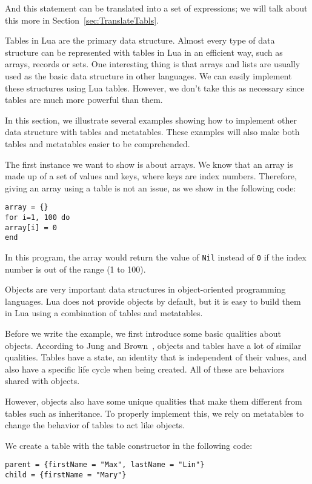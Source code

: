 And this statement can be translated into a set of expressions; we will talk about this more in Section~\ref{sec:TranslateTabls}.

Tables in Lua are the primary data structure. Almost every type of data structure can be represented with tables in Lua in an efficient way, such as arrays, records or sets. One interesting thing is that arrays and lists are usually used as the basic data structure in other languages. We can easily implement these structures using Lua tables. However, we don't take this as necessary since tables are much more powerful than them.

In this section, we illustrate several examples showing how to implement other data structure with tables and metatables. These examples will also make both tables and metatables easier to be comprehended.

The first instance we want to show is about arrays. We know that an array is made up of a set of values and keys, where keys are index numbers. Therefore, giving an array using a table is not an issue, as we show in the following code:

\begin{verbatim}
array = {}
for i=1, 100 do
array[i] = 0
end
\end{verbatim}

In this program, the array would return the value of {\tt Nil} instead of {\tt 0} if the index number is out of the range (1 to 100).

Objects are very important data structures in object-oriented programming languages. Lua does not provide objects by default, but it is easy to build them in Lua using a combination of tables and metatables.

Before we write the example, we first introduce some basic qualities about objects. According to Jung and Brown~\cite{begLua}, objects and tables have a lot of similar qualities. Tables have a state, an identity that is independent of their values, and also have a specific life cycle when being created. All of these are behaviors shared with objects.

However, objects also have some unique qualities that make them different from tables such as inheritance. To properly implement this, we rely on metatables to change the behavior of tables to act like objects.

We create a table with the table constructor in the following code:

\begin{verbatim}
parent = {firstName = "Max", lastName = "Lin"} 
child = {firstName = "Mary"} 
\end{verbatim}

